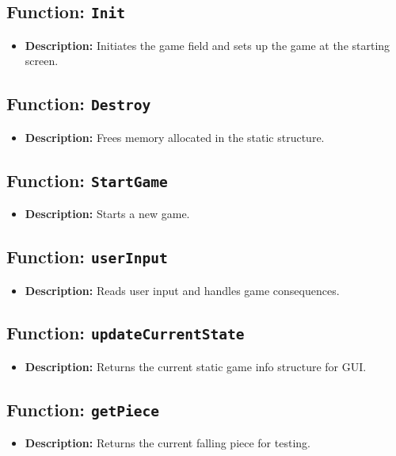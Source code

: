 \documentclass{article}
\begin{document}
\subsection{Function: \texttt{Init}}
\begin{itemize}
    \item \textbf{Description:} Initiates the game field and sets up the game at the starting screen.
\end{itemize}

\subsection{Function: \texttt{Destroy}}
\begin{itemize}
    \item \textbf{Description:} Frees memory allocated in the static structure.
\end{itemize}

\subsection{Function: \texttt{StartGame}}
\begin{itemize}
    \item \textbf{Description:} Starts a new game.
\end{itemize}

\subsection{Function: \texttt{userInput}}
\begin{itemize}
    \item \textbf{Description:} Reads user input and handles game consequences.
\end{itemize}

\subsection{Function: \texttt{updateCurrentState}}
\begin{itemize}
    \item \textbf{Description:} Returns the current static game info structure for GUI.
\end{itemize}

\subsection{Function: \texttt{getPiece}}
\begin{itemize}
    \item \textbf{Description:} Returns the current falling piece for testing.
\end{itemize}
\end{document}
